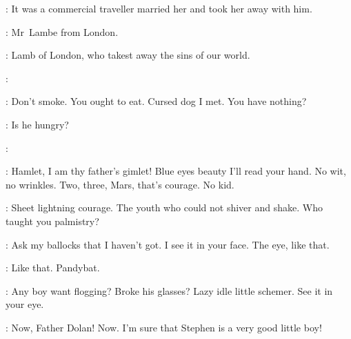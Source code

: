\Zoe:
It was a commercial traveller married her and took her away with him.

\Florry:
Mr~Lambe from London.

\Stephen:
Lamb of London, who takest away the sins of our world.

\Lynch:


\Bloom:
Don't smoke.
You ought to eat.
Cursed dog I met.
You have nothing?

\Zoe:
Is he hungry?

\Stephen:

\begin{verse}
\end{verse}


\Zoe:
Hamlet, I am thy father's gimlet!
Blue eyes beauty I'll read your hand.
No wit, no wrinkles.
Two, three, Mars, that's courage.
No kid.

\Lynch:
Sheet lightning courage.
The youth who could not shiver and shake.
Who taught you palmistry?

\Zoe:
Ask my ballocks that I haven't got.
I see it in your face.
The eye, like that.

\Lynch:
Like that.
Pandybat.


\FatherDolan:
Any boy want flogging?
Broke his glasses?
Lazy idle little schemer.
See it in your eye.


\DonJohnConmee:
Now, Father Dolan!
Now.
I'm sure that Stephen is a very good little boy!

